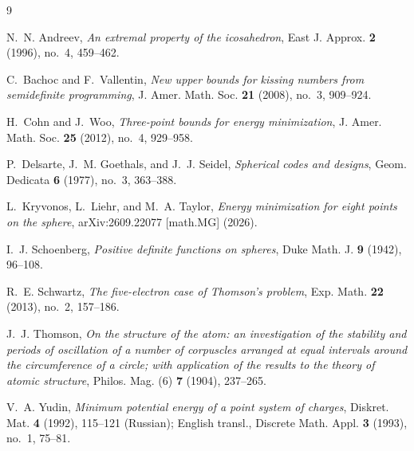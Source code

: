 \documentclass[11pt]{article}
\theoremstyle{definition}
\theoremstyle{remark}
\begin{document}
\begin{thebibliography}{9}

N.~N. Andreev, \emph{An extremal property of the icosahedron}, East J.
Approx. \textbf{2} (1996), no.~4, 459--462.

C.~Bachoc and F.~Vallentin, \emph{New upper bounds for kissing numbers
from semidefinite programming}, J. Amer. Math. Soc. \textbf{21} (2008),
no.~3, 909--924.

H.~Cohn and J.~Woo, \emph{Three-point bounds for energy minimization},
J. Amer. Math. Soc. \textbf{25} (2012), no.~4, 929--958.

P.~Delsarte, J.~M. Goethals, and J.~J. Seidel, \emph{Spherical codes and
designs}, Geom. Dedicata \textbf{6} (1977), no.~3, 363--388.

L.~Kryvonos, L.~Liehr, and M.~A. Taylor, \emph{Energy minimization for eight
points on the sphere}, arXiv:2609.22077 [math.MG] (2026).

I.~J. Schoenberg, \emph{Positive definite functions on spheres}, Duke
Math. J. \textbf{9} (1942), 96--108.

R.~E. Schwartz, \emph{The five-electron case of Thomson's problem}, Exp.
Math. \textbf{22} (2013), no.~2, 157--186.

J.~J. Thomson, \emph{On the structure of the atom: an investigation of
the stability and periods of oscillation of a number of corpuscles
arranged at equal intervals around the circumference of a circle; with
application of the results to the theory of atomic structure}, Philos.
Mag. (6) \textbf{7} (1904), 237--265.

V.~A. Yudin, \emph{Minimum potential energy of a point system of
charges}, Diskret. Mat. \textbf{4} (1992), 115--121 (Russian); English
transl., Discrete Math. Appl. \textbf{3} (1993), no.~1, 75--81.

\end{thebibliography}
\end{document}
